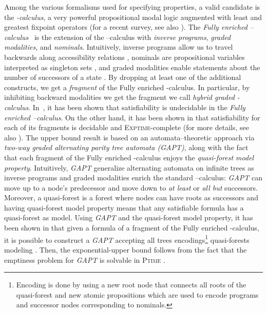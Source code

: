 \documentclass{LMCS}
\theoremstyle{plain}
\def \EXPTIME       {\textsc{Exptime}\xspace}
\def \PTIME         {\textsc{Ptime}\xspace}
\def \TGAPT         {\emph{GAPT}\xspace}
\begin{document}
Among the various formalisms used for specifying properties, a valid candidate
is the \emph{-calculus}, a very powerful propositional modal logic
augmented with least and greatest fixpoint operators \cite{Koz83} (for a recent
survey, see also \cite{BS06}). The \emph{Fully enriched
--calculus}~\cite{BP04} is the extension of the --calculus with
\emph{inverse programs}, \emph{graded modalities}, and \emph{nominals}.
Intuitively, inverse programs allow us to travel backwards along accessibility
relations \cite{Var98}, nominals are propositional variables interpreted as
singleton sets \cite{SV01}, and graded modalities enable statements about the
number of successors of a state \cite{KSV02}. By dropping at least one of the
additional constructs, we get a \emph{fragment} of the Fully enriched
-calculus. In particular, by inhibiting backward modalities we get the
fragment we call \emph{hybrid graded -calculus}. In~\cite{BP04}, it has
been shown that satisfiability is undecidable in the \emph{Fully enriched
--calculus}. On the other hand, it has been shown in \cite{SV01,BLMV06}
that satisfiability for each of its fragments is decidable and
\EXPTIME-complete (for more details, see also \cite{BLMV08}). The upper bound
result is based on an automata--theoretic approach via \emph{two-way graded
alternating parity tree automata (\TGAPT)}, along with the fact that each
fragment of the Fully enriched -calculus enjoys the \emph{quasi-forest
model property}. Intuitively, \TGAPT generalize alternating automata on
infinite trees as inverse programs and graded modalities enrich the standard
--calculus: \TGAPT can move up to a node's predecessor and move down to
\emph{at least } or \emph{all but } successors. Moreover, a quasi-forest
is a forest where nodes can have roots as successors and having quasi-forest
model property means that any satisfiable formula has a quasi-forest as model.
Using \TGAPT and the quasi-forest model property, it has been shown in
\cite{SV01,BLMV06} that given a formula  of a fragment of the Fully
enriched -calculus, it is possible to construct a \TGAPT accepting all
trees encodings\footnote{Encoding is done by using a new root node that
connects all roots of the quasi-forest and new atomic propositions which are
used to encode programs and successor nodes corresponding to nominals.}
quasi-forests modeling . Then, the exponential-upper bound follows
from the fact that the emptiness problem for \TGAPT is solvable in \PTIME
\cite{KPV02}.
\end{document}
